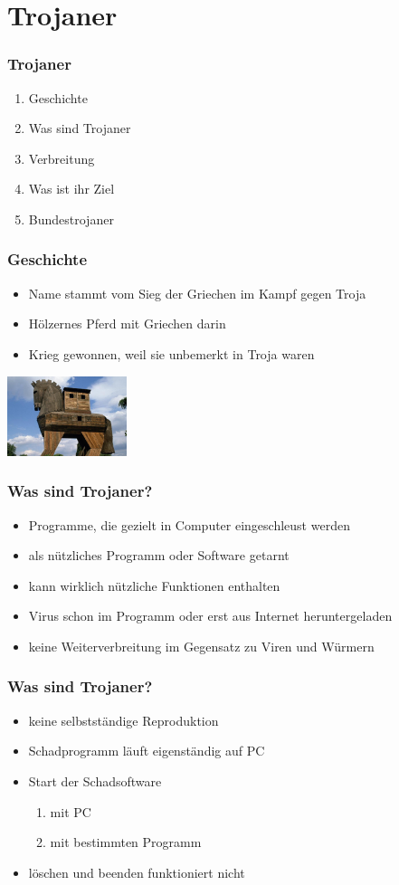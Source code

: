 \documentclass{beamer}
\begin{document}
\section{Trojaner}
\begin{frame}
	\frametitle{Trojaner}
	\begin{enumerate}
		\item Geschichte 
		\item Was sind Trojaner
		\item Verbreitung
		\item Was ist ihr Ziel
		\item Bundestrojaner 
	\end{enumerate}
\end{frame}

\begin{frame}
	\frametitle{Geschichte}
	\begin{itemize}
		\item Name stammt vom Sieg der Griechen im Kampf gegen Troja
		\item Hölzernes Pferd mit Griechen darin
		\item Krieg gewonnen, weil sie unbemerkt in Troja waren
	\end{itemize}
	\flushright
	\includegraphics[width= 3.5cm]{bilder/pferd.jpg}
\end{frame}

\begin{frame}
	\frametitle{Was sind Trojaner?}
	\begin{itemize}
		\item Programme, die gezielt in Computer eingeschleust werden
		\item als nützliches Programm oder Software getarnt
		\item kann wirklich nützliche Funktionen enthalten
		\item Virus schon im Programm oder erst aus Internet heruntergeladen
		\item keine Weiterverbreitung im Gegensatz zu Viren und Würmern
	\end{itemize}
\end{frame}

\begin{frame}
	\frametitle{Was sind Trojaner?}
	\begin{itemize}
		\item keine selbstständige Reproduktion
		\item Schadprogramm läuft eigenständig auf PC
		\item Start der Schadsoftware
		\begin{enumerate}
			\item mit PC
			\item mit bestimmten Programm
		\end{enumerate}
		\item löschen und beenden funktioniert nicht 
	\end{itemize}
\end{frame}
\end{document}
